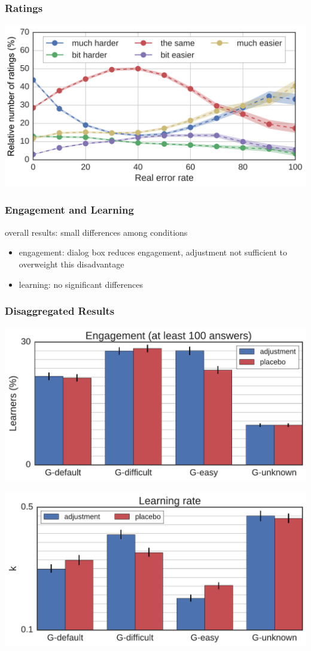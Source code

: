 \documentclass[bigger]{beamer}
\begin{document}
\begin{frame}
  \frametitle{Ratings}

  \begin{center}
    \includegraphics[width=\linewidth]{ratings}
  \end{center}
\end{frame}

\begin{frame}
  \frametitle{Engagement and Learning}

  overall results: small differences among conditions

  \medskip

  \begin{itemize}
  \item engagement: dialog box reduces engagement, adjustment not sufficient to
    overweight this disadvantage
  \item learning: no significant differences
  \end{itemize}
\end{frame}

\begin{frame}
  \frametitle{Disaggregated Results}

  \begin{center}
    \includegraphics[width=.6\linewidth]{survival_by_ratings}

    \includegraphics[width=.6\linewidth]{learning_by_ratings_slope}
  \end{center}
\end{frame}
\end{document}
